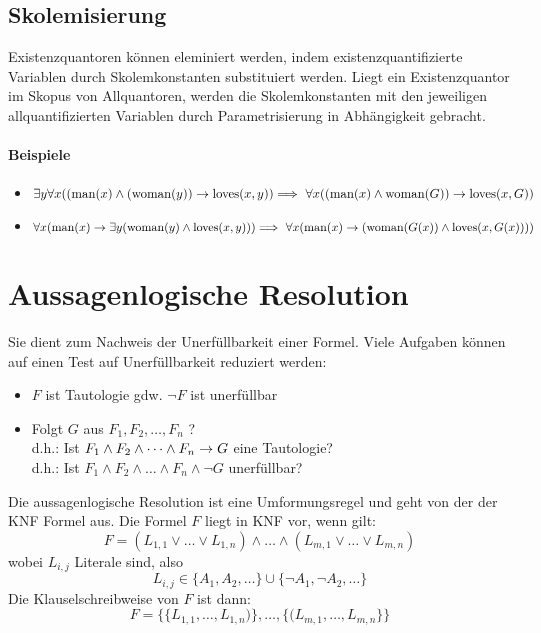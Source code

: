 \documentclass[a4paper,twoside,DIV15,BCOR12mm]{scrbook}
\begin{document}
\subsection{Skolemisierung}
Existenzquantoren können eleminiert werden, indem existenzquantifizierte Variablen durch Skolemkonstanten substituiert werden.
Liegt ein Existenzquantor im Skopus von Allquantoren, werden die Skolemkonstanten mit den jeweiligen allquantifizierten Variablen durch Parametrisierung in Abhängigkeit gebracht.

\paragraph{Beispiele}
\begin{itemize}
\item $\exists y \forall x ((\text{man}(x) \wedge (\text{woman}(y)) \rightarrow \text{loves}(x,y))
		\\\Longrightarrow\ \forall x ((\text{man}(x) \wedge \text{woman}(G)) \rightarrow \text{loves}(x, G))$\\
\item $\forall x (\text{man}(x) \rightarrow \exists y (\text{woman}(y) \wedge \text{loves}(x,y)))\\
		\Longrightarrow\ \forall x (\text{man}(x) \rightarrow (\text{woman} (G(x)) \wedge \text{loves}(x,G(x))))$
\end{itemize}

\section{Aussagenlogische Resolution}
Sie dient zum Nachweis der Unerfüllbarkeit einer Formel. Viele Aufgaben können auf einen Test auf Unerfüllbarkeit reduziert werden:
\begin{itemize}
\item $F$ ist Tautologie gdw. $\neg F$ ist unerfüllbar
\item Folgt $G$ aus $F_1,F_2,\dots, F_n$ ? \\
      d.h.: Ist $F_1 \wedge F_2 \wedge \dots \wedge F_n \rightarrow G$ eine Tautologie? \\
      d.h.: Ist $F_1 \wedge F_2 \wedge \dots \wedge F_n \wedge \neg G$ unerfüllbar? 
\end{itemize}

Die aussagenlogische Resolution ist eine Umformungsregel und geht von der  der KNF Formel aus. 
Die Formel $F$ liegt in KNF vor, wenn gilt:
	$$F=(L_{1,1}\vee\dots\vee L_{1,n})\wedge\dots\wedge(L_{m,1} \vee\dots\vee L_{m,n})$$
wobei $L_{i,j}$ Literale sind, also 
	$$L_{i,j}\in \{A_1,A_2,\dots\}\cup\{\neg A_1,\neg A_2,\dots\}$$
Die Klauselschreibweise von $F$ ist dann: 
	$$F=\{\{L_{1,1},\dots ,L_{1,n})\},\dots,\{(L_{m,1},\dots , L_{m,n}\}\}$$
\end{document}
